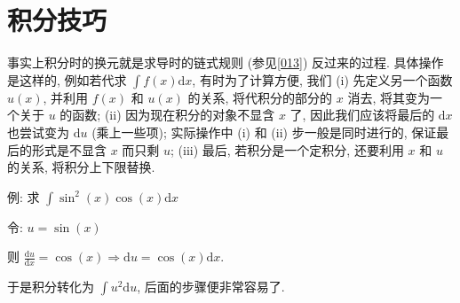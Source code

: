 \section{积分技巧}\label{020}

\begin{tcolorbox}[size=fbox, breakable, enhanced jigsaw, title={换元 (substitution)}]

事实上积分时的换元就是求导时的链式规则 (参见\ref{013}) 反过来的过程.
具体操作是这样的, 例如若代求 \(\int f(x)\mathrm{d}x\), 有时为了计算方便,
我们 (i) 先定义另一个函数 \(u(x)\), 并利用 \(f(x)\) 和 \(u(x)\) 的关系,
将代积分的部分的 \(x\) 消去, 将其变为一个关于 \(u\) 的函数; (ii)
因为现在积分的对象不显含 \(x\) 了, 因此我们应该将最后的 \(\mathrm{d}x\)
也尝试变为 \(\mathrm{d}u\) (乘上一些项); 实际操作中 (i) 和 (ii)
步一般是同时进行的, 保证最后的形式是不显含 \(x\) 而只剩 \(u\); (iii)
最后, 若积分是一个定积分, 还要利用 \(x\) 和 \(u\) 的关系,
将积分上下限替换.

\begin{newquote}
例: 求 \(\int\sin^2(x)\cos(x)\mathrm{d}x\)

令: \(u=\sin(x)\)

则
\(\frac{\mathrm{d}u}{\mathrm{d}x}=\cos(x)\Rightarrow\mathrm{d}u=\cos(x)\mathrm{d}x\).

于是积分转化为 \(\int u^2\mathrm{d}u\), 后面的步骤便非常容易了.
\end{newquote}

\end{tcolorbox}


